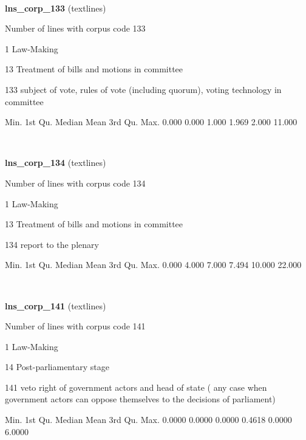 \documentclass[]{article}
\newenvironment{Shaded}{\begin{snugshade}}{\end{snugshade}}
\newcommand{\FloatTok}[1]{\textcolor[rgb]{0.00,0.00,0.81}{{#1}}}
\newcommand{\NormalTok}[1]{{#1}}
\begin{document}
~

\vspace{1em}

\textbf{lns\_corp\_133} (textlines)

Number of lines with corpus code 133

1 Law-Making

13 Treatment of bills and motions in committee

133 subject of vote, rules of vote (including quorum), voting technology
in committee

\begin{Shaded}
\begin{Highlighting}[]
   \NormalTok{Min. 1st Qu.  Median    Mean 3rd Qu.    Max. }
  \FloatTok{0.000}   \FloatTok{0.000}   \FloatTok{1.000}   \FloatTok{1.969}   \FloatTok{2.000}  \FloatTok{11.000} 
\end{Highlighting}
\end{Shaded}

~

\vspace{1em}

\textbf{lns\_corp\_134} (textlines)

Number of lines with corpus code 134

1 Law-Making

13 Treatment of bills and motions in committee

134 report to the plenary

\begin{Shaded}
\begin{Highlighting}[]
   \NormalTok{Min. 1st Qu.  Median    Mean 3rd Qu.    Max. }
  \FloatTok{0.000}   \FloatTok{4.000}   \FloatTok{7.000}   \FloatTok{7.494}  \FloatTok{10.000}  \FloatTok{22.000} 
\end{Highlighting}
\end{Shaded}

~

\vspace{1em}

\textbf{lns\_corp\_141} (textlines)

Number of lines with corpus code 141

1 Law-Making

14 Post-parliamentary stage

141 veto right of government actors and head of state ( any case when
government actors can oppose themselves to the decisions of parliament)

\begin{Shaded}
\begin{Highlighting}[]
   \NormalTok{Min. 1st Qu.  Median    Mean 3rd Qu.    Max. }
 \FloatTok{0.0000}  \FloatTok{0.0000}  \FloatTok{0.0000}  \FloatTok{0.4618}  \FloatTok{0.0000}  \FloatTok{6.0000} 
\end{Highlighting}
\end{Shaded}
\end{document}
